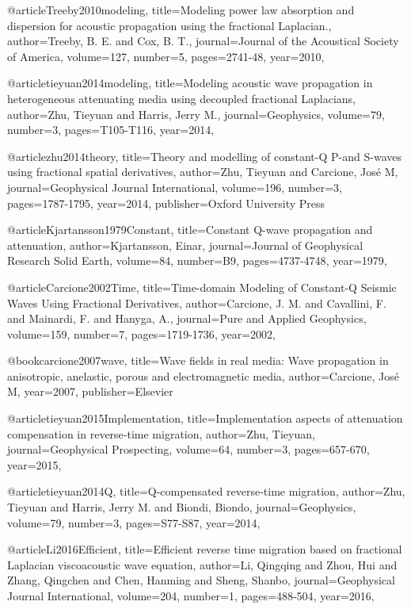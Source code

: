 {@article{Treeby2010modeling,
  title={Modeling power law absorption and dispersion for acoustic propagation using the fractional Laplacian.},
  author={Treeby, B. E. and Cox, B. T.},
  journal={Journal of the Acoustical Society of America},
  volume={127},
  number={5},
  pages={2741-48},
  year={2010},
}

@article{tieyuan2014modeling,
  title={Modeling acoustic wave propagation in heterogeneous attenuating media using decoupled fractional Laplacians},
  author={Zhu, Tieyuan and Harris, Jerry M.},
  journal={Geophysics},
  volume={79},
  number={3},
  pages={T105-T116},
  year={2014},
}

@article{zhu2014theory,
  title={Theory and modelling of constant-{Q} {P}-and {S}-waves using fractional spatial derivatives},
  author={Zhu, Tieyuan and Carcione, Jos{\'e} M},
  journal={Geophysical Journal International},
  volume={196},
  number={3},
  pages={1787-1795},
  year={2014},
  publisher={Oxford University Press}
}


@article{Kjartansson1979Constant,
  title={Constant {Q}-wave propagation and attenuation},
  author={Kjartansson, Einar},
  journal={Journal of Geophysical Research Solid Earth},
  volume={84},
  number={B9},
  pages={4737-4748},
  year={1979},
}

@article{Carcione2002Time,
  title={Time-domain Modeling of Constant-{Q} Seismic Waves Using Fractional Derivatives},
  author={Carcione, J. M. and Cavallini, F. and Mainardi, F. and Hanyga, A.},
  journal={Pure and Applied Geophysics},
  volume={159},
  number={7},
  pages={1719-1736},
  year={2002},
}

@book{carcione2007wave,
  title={Wave fields in real media: Wave propagation in anisotropic, anelastic, porous and electromagnetic media},
  author={Carcione, Jos{\'e} M},
  year={2007},
  publisher={Elsevier}
}

@article{tieyuan2015Implementation,
  title={Implementation aspects of attenuation compensation in reverse‐time migration},
  author={Zhu, Tieyuan},
  journal={Geophysical Prospecting},
  volume={64},
  number={3},
  pages={657-670},
  year={2015},
}

@article{tieyuan2014Q,
  title={Q-compensated reverse-time migration},
  author={Zhu, Tieyuan and Harris, Jerry M. and Biondi, Biondo},
  journal={Geophysics},
  volume={79},
  number={3},
  pages={S77-S87},
  year={2014},
}

@article{Li2016Efficient,
  title={Efficient reverse time migration based on fractional {L}aplacian viscoacoustic wave equation},
  author={Li, Qingqing and Zhou, Hui and Zhang, Qingchen and Chen, Hanming and Sheng, Shanbo},
  journal={Geophysical Journal International},
  volume={204},
  number={1},
  pages={488-504},
  year={2016},
}

}
